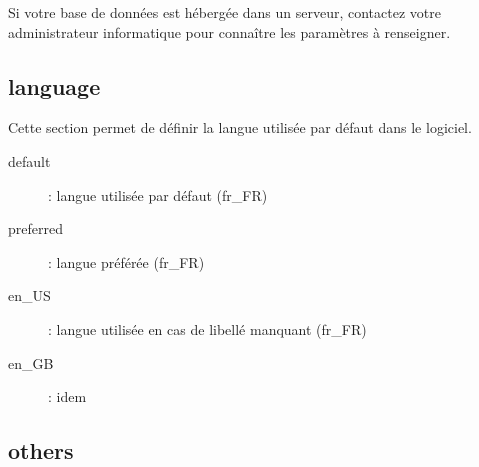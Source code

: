 Si votre base de données est hébergée dans un serveur, contactez votre administrateur informatique pour connaître les paramètres à renseigner.

\subsection{language}

Cette section permet de définir la langue utilisée par défaut dans le logiciel.

\begin{description}
\item [default] : langue utilisée par défaut (fr\_FR)
\item [preferred] : langue préférée (fr\_FR)
\item[en\_US]: langue utilisée en cas de libellé manquant (fr\_FR)
\item [en\_GB] : idem
\end{description}


\subsection{others}

